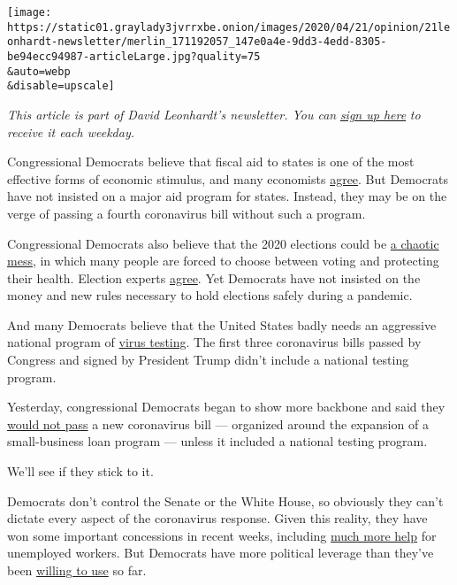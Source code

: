\texttt{[image: https://static01.graylady3jvrrxbe.onion/images/2020/04/21/opinion/21leonhardt-newsletter/merlin\_171192057\_147e0a4e-9dd3-4edd-8305-be94ecc94987-articleLarge.jpg?quality=75\\\&auto=webp\\\&disable=upscale]}

\emph{This article is part of David Leonhardt's newsletter. You can}
\href{https://www.nytimes3xbfgragh.onion/newsletters/opiniontoday?action=click\&module=Intentional\&pgtype=Article}{\emph{sign
up here}} \emph{to receive it each weekday.}

Congressional Democrats believe that fiscal aid to states is one of the
most effective forms of economic stimulus, and many economists
\href{https://www.economy.com/mark-zandi/documents/Stimulus-Impact-2008.pdf}{agree}.
But Democrats have not insisted on a major aid program for states.
Instead, they may be on the verge of passing a fourth coronavirus bill
without such a program.

Congressional Democrats also believe that the 2020 elections could be
\href{https://www.nytimes3xbfgragh.onion/2020/04/03/opinion/wisconsin-primary-coronavirus.html}{a
chaotic mess}, in which many people are forced to choose between voting
and protecting their health. Election experts
\href{https://electionlawblog.org/?p=110034}{agree}. Yet Democrats have
not insisted on the money and new rules necessary to hold elections
safely during a pandemic.

And many Democrats believe that the United States badly needs an
aggressive national program of
\href{https://www.nytimes3xbfgragh.onion/2020/04/06/health/coronavirus-testing-us.html}{virus
testing}. The first three coronavirus bills passed by Congress and
signed by President Trump didn't include a national testing program.

Yesterday, congressional Democrats began to show more backbone and said
they
\href{https://www.nytimes3xbfgragh.onion/2020/04/20/us/politics/congress-coronavirus-bill.html}{would
not pass} a new coronavirus bill --- organized around the expansion of a
small-business loan program --- unless it included a national testing
program.

We'll see if they stick to it.

Democrats don't control the Senate or the White House, so obviously they
can't dictate every aspect of the coronavirus response. Given this
reality, they have won some important concessions in recent weeks,
including
\href{https://www.nytimes3xbfgragh.onion/2020/03/25/us/politics/coronavirus-senate-deal.html}{much
more help} for unemployed workers. But Democrats have more political
leverage than they've been
\href{https://www.nytimes3xbfgragh.onion/2020/04/06/opinion/coronavirus-stimulus-democrats.html}{willing
to use} so far.


